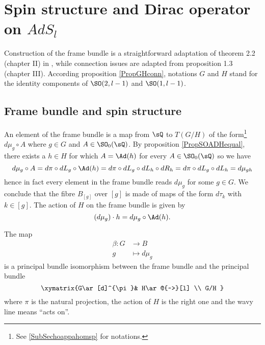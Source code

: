 \section{Spin structure and Dirac operator on \texorpdfstring{$AdS_{l}$}{AdSl}}\label{SecDirADs}

Construction of the frame bundle is a straightforward adaptation of theorem 2.2 (chapter II) in \cite{AnnikFranc}, while connection issues are adapted from proposition 1.3 (chapter III).  According proposition \ref{PropGHconn}, notations $G$ and $H$ stand for the identity components of $\SO(2,l-1)$ and $\SO(1,l-1)$.

\subsection{Frame bundle and spin structure}

An element of the frame bundle is a map from $\sQ$ to $T(G/H)$ of the form\footnote{See \ref{SubSechoappahomsp} for notations.} $d\mu_g\circ A$ where $g\in G$ and $A\in \SO_0(\sQ)$. By proposition \ref{PropSOADHequal}, there exists a $h\in H$ for which $A=\Ad(h)$ for every $A\in\SO_0(\sQ)$ so we have
\[ 
 d\mu_g\circ A=d\pi\circ dL_g\circ\Ad(h)=d\pi\circ dL_g \circ dL_h\circ dR_h=d\pi\circ dL_g \circ dL_h=d\mu_{gh}
\]
hence in fact every element in the frame bundle reads $d\mu_g$ for some $g\in G$. We conclude that the fibre $B_{[g]}$ over $[g]$ is made of maps of the form $d\tau_k$ with $k\in[g]$. The action of $H$ on the frame bundle is given by 
\[ 
  (d\mu_g)\cdot h=d\mu_g\circ\Ad(h).
\]

\begin{proposition}
The map
\begin{equation}
\begin{aligned}
 \beta\colon G&\to B \\ 
g&\mapsto d\mu_g 
\end{aligned}
\end{equation}
is a principal bundle isomorphism between the frame bundle and the principal bundle
\begin{equation}        \label{PrincHGGH}
\xymatrix{%
    G\ar[d]^{\pi}& H\ar@{~>}[l]     \\
                    G/H
 }
\end{equation}
where $\pi$ is the natural projection, the action of $H$ is the right one and the wavy line means ``acts on''.
\end{proposition}

